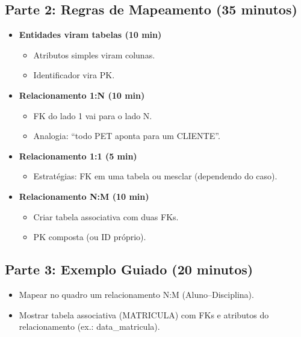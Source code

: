 \documentclass[12pt,a4paper]{article}
\begin{document}
\subsection*{Parte 2: Regras de Mapeamento (35 minutos)}
\begin{itemize}[leftmargin=*,itemsep=0.35em]
  \item \textbf{Entidades viram tabelas (10 min)}
  \begin{itemize}[leftmargin=*,itemsep=0.25em]
    \item Atributos simples viram colunas.
    \item Identificador vira PK.
  \end{itemize}
  \item \textbf{Relacionamento 1:N (10 min)}
  \begin{itemize}[leftmargin=*,itemsep=0.25em]
    \item FK do lado 1 vai para o lado N.
    \item Analogia: ``todo PET aponta para um CLIENTE''.
  \end{itemize}
  \item \textbf{Relacionamento 1:1 (5 min)}
  \begin{itemize}[leftmargin=*,itemsep=0.25em]
    \item Estratégias: FK em uma tabela ou mesclar (dependendo do caso).
  \end{itemize}
  \item \textbf{Relacionamento N:M (10 min)}
  \begin{itemize}[leftmargin=*,itemsep=0.25em]
    \item Criar tabela associativa com duas FKs.
    \item PK composta (ou ID próprio).
  \end{itemize}
\end{itemize}

\subsection*{Parte 3: Exemplo Guiado (20 minutos)}
\begin{itemize}[leftmargin=*,itemsep=0.35em]
  \item Mapear no quadro um relacionamento N:M (Aluno--Disciplina).
  \item Mostrar tabela associativa (MATRICULA) com FKs e atributos do relacionamento (ex.: data\_matricula).
\end{itemize}
\end{document}

